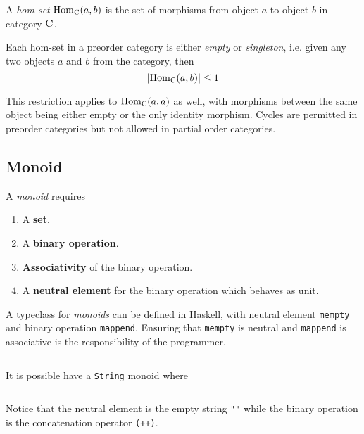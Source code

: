\begin{definition}
    A \textit{hom-set} $\mathrm{Hom}_{{\normalfont\textsc{C}}}(a, b)$ is the set of morphisms from object $a$ to object $b$ in category ${\normalfont\textsc{C}}$.
    
    Each hom-set in a preorder category is either \textit{empty} or \textit{singleton}, i.e. given any two objects $a$ and $b$ from the category, then
    \begin{equation}
        \left\lvert \mathrm{Hom}_{{\normalfont\textsc{C}}}(a, b) \right\rvert \le 1
    \end{equation}
    
    This restriction applies to $\mathrm{Hom}_{{\normalfont\textsc{C}}}(a, a)$ as well, with morphisms between the same object being either empty or the only identity morphism. Cycles are permitted in preorder categories but not allowed in partial order categories.
\end{definition}

\subsection{Monoid}

\begin{definition}[Monoid]
    A \textit{monoid} requires
    \begin{enumerate}
        \item A \textbf{set}.
        \item A \textbf{binary operation}.
        \item \textbf{Associativity} of the binary operation.
        \item A \textbf{neutral element} for the binary operation which behaves as unit.
    \end{enumerate}
    
    A typeclass for \textit{monoids} can be defined in Haskell, with neutral element \texttt{mempty} and binary operation \texttt{mappend}. Ensuring that \texttt{mempty} is neutral and \texttt{mappend} is associative is the responsibility of the programmer.
    \inputminted{hs}{content/code-listings/monoid.hs}
\end{definition}

\begin{example}
    It is possible have a \texttt{String} monoid where
    \inputminted{hs}{content/code-listings/string-monoid.hs}
    
    Notice that the neutral element is the empty string \texttt{""} while the binary operation is the concatenation operator \texttt{(++)}.
\end{example}

